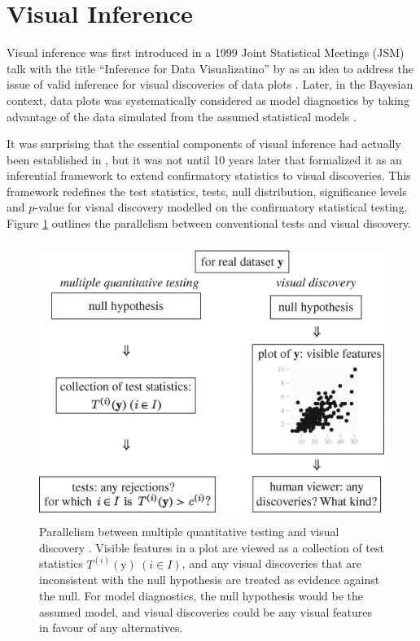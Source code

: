 \documentclass{monashthesis}
\theoremstyle{definition}
\theoremstyle{definition}
\theoremstyle{definition}
\theoremstyle{definition}
\theoremstyle{remark}
\begin{document}
\hypertarget{se:vi}{%
\section{Visual Inference}\label{se:vi}}

Visual inference was first introduced in a 1999 Joint Statistical Meetings (JSM) talk with the title ``Inference for Data Visualizatino'' by \textcite{buja_inference_1999} as an idea to address the issue of valid inference for visual discoveries of data plots \autocite{gelman_exploratory_2004}. Later, in the Bayesian context, data plots was systematically considered as model diagnostics by taking advantage of the data simulated from the assumed statistical models \autocite{gelman_bayesian_2003,gelman_exploratory_2004}.

It was surprising that the essential components of visual inference had actually been established in \textcite{buja_inference_1999}, but it was not until 10 years later that \textcite{buja_statistical_2009} formalized it as an inferential framework to extend confirmatory statistics to visual discoveries. This framework redefines the test statistics, tests, null distribution, significance levels and \(p\)-value for visual discovery modelled on the confirmatory statistical testing. Figure \ref{fig:parallelism} outlines the parallelism between conventional tests and visual discovery.

\begin{figure}
\centering
\includegraphics[width=4.6875in,height=3.55208in]{figures/rsta2009012001.jpg}
\caption{Parallelism between multiple quantitative testing and visual discovery \autocite{buja_statistical_2009}. Visible features in a plot are viewed as a collection of test statistics \(T^{(i)}(\boldsymbol{\mathrm{y}})~(i \in I)\), and any visual discoveries that are inconsistent with the null hypothesis are treated as evidence against the null. For model diagnostics, the null hypothesis would be the assumed model, and visual discoveries could be any visual features in favour of any alternatives. \label{fig:parallelism}}
\end{figure}
\end{document}
